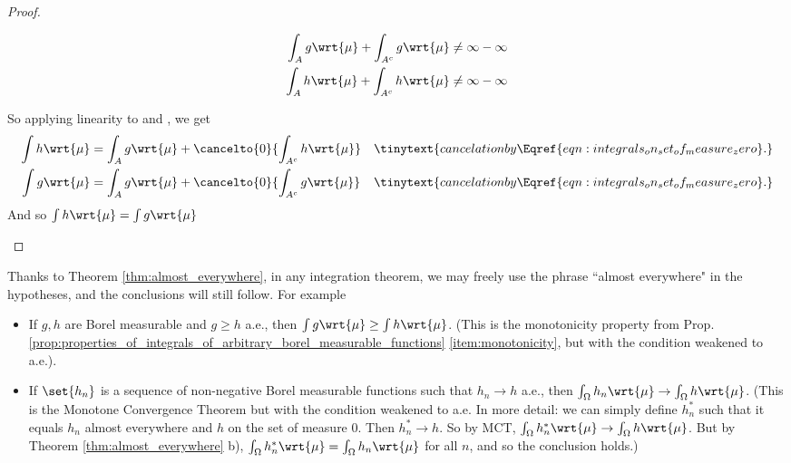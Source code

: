 \documentclass{article} %
\newcommand{\dmu}{\wrt{\mu}}
\begin{document}
\begin{proof}
\begin{alphabate}
\begin{enumerate}
\begin{itemize}
		\begin{align*}
		\int_A g \dmu + \int_{A^c} g \dmu & \neq \infty - \infty \\
		\int_A h \dmu + \int_{A^c} h \dmu  & \neq \infty - \infty \\	
		\end{align*}
		\end{itemize}
		So applying linearity to  and , we get 
		\begin{align*}
		\int h \dmu &= 	\int_A g \dmu + 	\cancelto{0}{\int_{A^c} h \dmu} && \tinytext{cancelation by \Eqref{eqn:integrals_on_set_of_measure_zero}.} \\
		\int g \dmu &= 	\int_A g \dmu + 		\cancelto{0}{\int_{A^c} g \dmu} && \tinytext{cancelation by \Eqref{eqn:integrals_on_set_of_measure_zero}.} \\
		\end{align*}
		And so $\int h \dmu = \int g \dmu$
		\end{enumerate}
	\end{alphabate}
\fi 
\end{proof}

\begin{remark}
	
Thanks to Theorem \ref{thm:almost_everywhere}, in any integration theorem, we may freely use the phrase ``almost everywhere" in the hypotheses, and the conclusions will still follow.  For example
\begin{itemize}
\item If $g,h$ are Borel measurable and $g \geq h$ a.e., then $\int g \dmu \geq \int h \dmu$.  {\tiny (This is the monotonicity property from Prop. \ref{prop:properties_of_integrals_of_arbitrary_borel_measurable_functions} \ref{item:monotonicity}, but with the condition weakened to a.e.). }
\item If $\set{h_n}$ is a sequence of non-negative Borel measurable functions such that $h_n \to h$ a.e., then $\int_\Omega h_n \dmu \to \int_\Omega h \dmu$. {\tiny (This is the Monotone Convergence Theorem but with the condition weakened to a.e.  In more detail: we can simply define $h^*_n$ such that it equals $h_n$ almost everywhere and $h$ on the set of measure 0.  Then $h^*_n \to h$.  So by MCT,  $\int_\Omega h^*_n \dmu \to \int_\Omega h \dmu$.  But by Theorem \ref{thm:almost_everywhere} b), $\int_\Omega h^*_n \dmu  = \int_\Omega h_n \dmu$ for all $n$, and so the conclusion holds.)  }
\end{itemize}
\end{remark}
\end{document}
